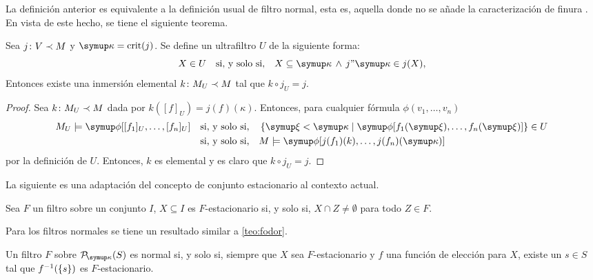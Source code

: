 La definición anterior es equivalente \autocite[Ejercicio 22.5]{kanamori_higher_2009}
a la definición usual de filtro normal, esta es, aquella donde no se añade
la caracterización de finura \autocite[52]{kanamori_higher_2009}.
En vista de este hecho, se tiene el siguiente teorema.

\begin{teo}\label{teo:exists-k}
    Sea $j\colon V\prec M$ y $\kappa=\crit{j}$. Se define un ultrafiltro $U$
    de la siguiente forma:
    \[
        X\in U\quad\text{si, y solo si,}\quad X\subseteq \kappa \,\land\, j"\kappa\in j(X),
    \]
    Entonces existe una inmersión elemental $k\colon M_U\prec M$ tal que $k\circ j_U = j$.
\end{teo}

\begin{proof}
    Sea $k\colon M_U\prec M$ dada por $k([f]_U)=j(f)(\kappa)$. Entonces, para
    cualquier fórmula $\phi(v_1,\dots,v_n)$
    \begin{align*}
        M_U \models\phi[[f_1]_U,\dots,[f_n]_U]
        &\quad\text{si, y solo si,}\quad
        \set{\xi<\kappa\mid\phi[f_1(\xi),\dots,f_n(\xi)]} \in U \\
        &\quad\text{si, y solo si,}\quad
        M \models \phi[j(f_1)(k),\dots,j(f_n)(\kappa)]
    \end{align*}
    por la definición de $U$. Entonces, $k$ es elemental y es claro que $k\circ j_U=j$.
\end{proof}

La siguiente es una adaptación del concepto de conjunto estacionario al
contexto actual.

\begin{defi}
    Sea $F$ un filtro sobre un conjunto $I$, $X\subseteq I$ es $F$-estacionario si, y solo si,
    $X\cap Z\neq\emptyset$ para todo $Z\in F$.
\end{defi}

Para los filtros normales se tiene un resultado similar a \ref{teo:fodor}.

\begin{teo}\label{teo:normal-fodor}
    Un filtro $F$ sobre $\pwset[\kappa]{S}$ es normal si, y solo si,
    siempre que $X$ sea $F$-estacionario y $f$ una función de elección para $X$,
    existe un $s\in S$ tal que $f^{-1}(\left\{ s \right\})$ es $F$-estacionario.
\end{teo}

